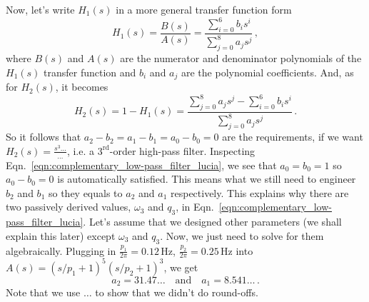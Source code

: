 Now, let's write $H_1(s)$ in a more general transfer function form
\begin{equation}
	H_1(s) = \frac{B(s)}{A(s)} = \frac{\sum_{i=0}^6 b_is^i}{\sum_{j=0}^8 a_js^j}\,,
	\label{eqn:complementary_low-pass_filter_lucia_polynomial}
\end{equation}
where $B(s)$ and $A(s)$ are the numerator and denominator polynomials of the $H_1(s)$ transfer function and $b_i$ and $a_j$ are the polynomial coefficients.
And, as for $H_2(s)$, it becomes
\begin{equation}
	H_2(s) = 1-H_1(s) = \frac{\sum_{j=0}^8 a_js^j - \sum_{i=0}^6 b_is^i}{\sum_{j=0}^8 a_j s^j}\,.
\end{equation}
So it follows that $a_2-b_2=a_1-b_1=a_0-b_0=0$ are the requirements, if we want $H_2(s) = \frac{s^3\dots}{\dots}$, i.e. a $3^\mathrm{rd}$-order high-pass filter.
Inspecting Eqn.~\eqref{eqn:complementary_low-pass_filter_lucia}, we see that $a_0=b_0=1$ so $a_0-b_0=0$ is automatically satisfied.
This means what we still need to engineer $b_2$ and $b_1$ so they equals to $a_2$ and $a_1$ respectively.
This explains why there are two passively derived values, $\omega_3$ and $q_3$, in Eqn.~\eqref{eqn:complementary_low-pass_filter_lucia}.
Let's assume that we designed other parameters (we shall explain this later) except $\omega_3$ and $q_3$.
Now, we just need to solve for them algebraically.
Plugging in $\frac{p_1}{2\pi} = 0.12\,\mathrm{Hz}$, $\frac{p_2}{2\pi} = 0.25\,\mathrm{Hz}$ into $A(s) = (s/p_1+1)^5(s/p_2+1)^3$, we get
\begin{equation}
	a_2=31.47\dots \quad\text{and}\quad a_1=8.541\dots\,.
\end{equation}
Note that we use $\dots$ to show that we didn't do round-offs.

